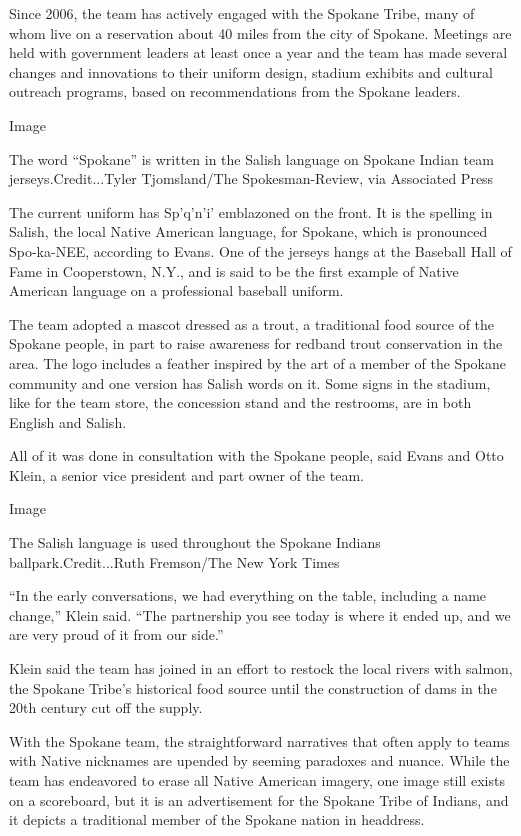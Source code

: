 Since 2006, the team has actively engaged with the Spokane Tribe, many
of whom live on a reservation about 40 miles from the city of Spokane.
Meetings are held with government leaders at least once a year and the
team has made several changes and innovations to their uniform design,
stadium exhibits and cultural outreach programs, based on
recommendations from the Spokane leaders.

Image

The word ``Spokane'' is written in the Salish language on Spokane Indian
team jerseys.Credit...Tyler Tjomsland/The Spokesman-Review, via
Associated Press

The current uniform has Sp'q'n'i' emblazoned on the front. It is the
spelling in Salish, the local Native American language, for Spokane,
which is pronounced Spo-ka-NEE, according to Evans. One of the jerseys
hangs at the Baseball Hall of Fame in Cooperstown, N.Y., and is said to
be the first example of Native American language on a professional
baseball uniform.

The team adopted a mascot dressed as a trout, a traditional food source
of the Spokane people, in part to raise awareness for redband trout
conservation in the area. The logo includes a feather inspired by the
art of a member of the Spokane community and one version has Salish
words on it. Some signs in the stadium, like for the team store, the
concession stand and the restrooms, are in both English and Salish.

All of it was done in consultation with the Spokane people, said Evans
and Otto Klein, a senior vice president and part owner of the team.

Image

The Salish language is used throughout the Spokane Indians
ballpark.Credit...Ruth Fremson/The New York Times

``In the early conversations, we had everything on the table, including
a name change,'' Klein said. ``The partnership you see today is where it
ended up, and we are very proud of it from our side.''

Klein said the team has joined in an effort to restock the local rivers
with salmon, the Spokane Tribe's historical food source until the
construction of dams in the 20th century cut off the supply.

With the Spokane team, the straightforward narratives that often apply
to teams with Native nicknames are upended by seeming paradoxes and
nuance. While the team has endeavored to erase all Native American
imagery, one image still exists on a scoreboard, but it is an
advertisement for the Spokane Tribe of Indians, and it depicts a
traditional member of the Spokane nation in headdress.

